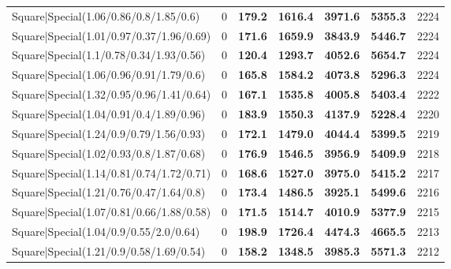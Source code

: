 \begin{tabular}{lrllllr}
 Square|Special(1.06/0.86/0.8/1.85/0.6)                        &             0   & \textbf{179.2} & \textbf{1616.4} & \textbf{3971.6} & \textbf{5355.3} &         2224 \\
 Square|Special(1.01/0.97/0.37/1.96/0.69)                      &             0   & \textbf{171.6} & \textbf{1659.9} & \textbf{3843.9} & \textbf{5446.7} &         2224 \\
 Square|Special(1.1/0.78/0.34/1.93/0.56)                       &             0   & \textbf{120.4} & \textbf{1293.7} & \textbf{4052.6} & \textbf{5654.7} &         2224 \\
 Square|Special(1.06/0.96/0.91/1.79/0.6)                       &             0   & \textbf{165.8} & \textbf{1584.2} & \textbf{4073.8} & \textbf{5296.3} &         2224 \\
 Square|Special(1.32/0.95/0.96/1.41/0.64)                      &             0   & \textbf{167.1} & \textbf{1535.8} & \textbf{4005.8} & \textbf{5403.4} &         2222 \\
 Square|Special(1.04/0.91/0.4/1.89/0.96)                       &             0   & \textbf{183.9} & \textbf{1550.3} & \textbf{4137.9} & \textbf{5228.4} &         2220 \\
 Square|Special(1.24/0.9/0.79/1.56/0.93)                       &             0   & \textbf{172.1} & \textbf{1479.0} & \textbf{4044.4} & \textbf{5399.5} &         2219 \\
 Square|Special(1.02/0.93/0.8/1.87/0.68)                       &             0   & \textbf{176.9} & \textbf{1546.5} & \textbf{3956.9} & \textbf{5409.9} &         2218 \\
 Square|Special(1.14/0.81/0.74/1.72/0.71)                      &             0   & \textbf{168.6} & \textbf{1527.0} & \textbf{3975.0} & \textbf{5415.2} &         2217 \\
 Square|Special(1.21/0.76/0.47/1.64/0.8)                       &             0   & \textbf{173.4} & \textbf{1486.5} & \textbf{3925.1} & \textbf{5499.6} &         2216 \\
 Square|Special(1.07/0.81/0.66/1.88/0.58)                      &             0   & \textbf{171.5} & \textbf{1514.7} & \textbf{4010.9} & \textbf{5377.9} &         2215 \\
 Square|Special(1.04/0.9/0.55/2.0/0.64)                        &             0   & \textbf{198.9} & \textbf{1726.4} & \textbf{4474.3} & \textbf{4665.5} &         2213 \\
 Square|Special(1.21/0.9/0.58/1.69/0.54)                       &             0   & \textbf{158.2} & \textbf{1348.5} & \textbf{3985.3} & \textbf{5571.3} &         2212 \\

\end{tabular}
